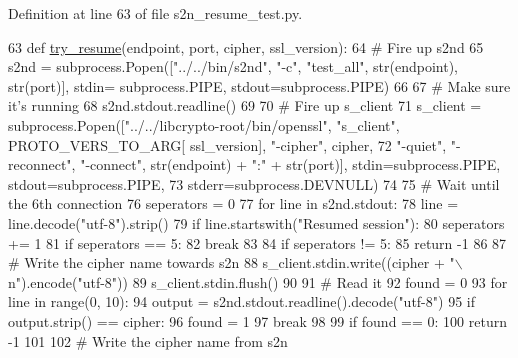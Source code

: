 Definition at line 63 of file s2n\+\_\+resume\+\_\+test.\+py.


\begin{DoxyCode}
63 \textcolor{keyword}{def }\hyperlink{namespaces2n__resume__test_aaa7497098a8d662d5a0f51a1a491540d}{try\_resume}(endpoint, port, cipher, ssl\_version):
64     \textcolor{comment}{# Fire up s2nd}
65     s2nd = subprocess.Popen([\textcolor{stringliteral}{"../../bin/s2nd"}, \textcolor{stringliteral}{"-c"}, \textcolor{stringliteral}{"test\_all"}, str(endpoint), str(port)], stdin=
      subprocess.PIPE, stdout=subprocess.PIPE)
66 
67     \textcolor{comment}{# Make sure it's running}
68     s2nd.stdout.readline()
69 
70     \textcolor{comment}{# Fire up s\_client}
71     s\_client = subprocess.Popen([\textcolor{stringliteral}{"../../libcrypto-root/bin/openssl"}, \textcolor{stringliteral}{"s\_client"}, PROTO\_VERS\_TO\_ARG[
      ssl\_version], \textcolor{stringliteral}{"-cipher"}, cipher,
72                                  \textcolor{stringliteral}{"-quiet"}, \textcolor{stringliteral}{"-reconnect"}, \textcolor{stringliteral}{"-connect"}, str(endpoint) + \textcolor{stringliteral}{":"} + str(port)], 
      stdin=subprocess.PIPE, stdout=subprocess.PIPE,
73                                  stderr=subprocess.DEVNULL)
74 
75     \textcolor{comment}{# Wait until the 6th connection}
76     seperators = 0
77     \textcolor{keywordflow}{for} line \textcolor{keywordflow}{in} s2nd.stdout:
78         line = line.decode(\textcolor{stringliteral}{"utf-8"}).strip()
79         \textcolor{keywordflow}{if} line.startswith(\textcolor{stringliteral}{"Resumed session"}):
80             seperators += 1
81         \textcolor{keywordflow}{if} seperators == 5:
82             \textcolor{keywordflow}{break}
83 
84     \textcolor{keywordflow}{if} seperators != 5:
85         \textcolor{keywordflow}{return} -1
86 
87     \textcolor{comment}{# Write the cipher name towards s2n}
88     s\_client.stdin.write((cipher + \textcolor{stringliteral}{"\(\backslash\)n"}).encode(\textcolor{stringliteral}{"utf-8"}))
89     s\_client.stdin.flush()
90 
91     \textcolor{comment}{# Read it}
92     found = 0
93     \textcolor{keywordflow}{for} line \textcolor{keywordflow}{in} range(0, 10):
94         output = s2nd.stdout.readline().decode(\textcolor{stringliteral}{"utf-8"})
95         \textcolor{keywordflow}{if} output.strip() == cipher:
96             found = 1
97             \textcolor{keywordflow}{break}
98 
99     \textcolor{keywordflow}{if} found == 0:
100         \textcolor{keywordflow}{return} -1
101 
102     \textcolor{comment}{# Write the cipher name from s2n}

\end{DoxyCode}
